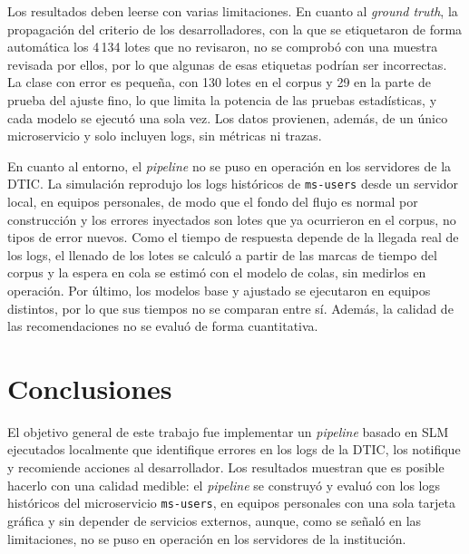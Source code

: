 Los resultados deben leerse con varias limitaciones. En cuanto al \textit{ground truth}, la propagación del criterio de los desarrolladores, con la que se etiquetaron de forma automática los 4\,134 lotes que no revisaron, no se comprobó con una muestra revisada por ellos, por lo que algunas de esas etiquetas podrían ser incorrectas. La clase con error es pequeña, con 130 lotes en el corpus y 29 en la parte de prueba del ajuste fino, lo que limita la potencia de las pruebas estadísticas, y cada modelo se ejecutó una sola vez. Los datos provienen, además, de un único microservicio y solo incluyen logs, sin métricas ni trazas.

En cuanto al entorno, el \textit{pipeline} no se puso en operación en los servidores de la DTIC. La simulación reprodujo los logs históricos de \texttt{ms-users} desde un servidor local, en equipos personales, de modo que el fondo del flujo es normal por construcción y los errores inyectados son lotes que ya ocurrieron en el corpus, no tipos de error nuevos. Como el tiempo de respuesta depende de la llegada real de los logs, el llenado de los lotes se calculó a partir de las marcas de tiempo del corpus y la espera en cola se estimó con el modelo de colas, sin medirlos en operación. Por último, los modelos base y ajustado se ejecutaron en equipos distintos, por lo que sus tiempos no se comparan entre sí. Además, la calidad de las recomendaciones no se evaluó de forma cuantitativa.

\section{Conclusiones}\label{sec:conclusiones}

El objetivo general de este trabajo fue implementar un \textit{pipeline} basado en SLM ejecutados localmente que identifique errores en los logs de la DTIC, los notifique y recomiende acciones al desarrollador. Los resultados muestran que es posible hacerlo con una calidad medible: el \textit{pipeline} se construyó y evaluó con los logs históricos del microservicio \texttt{ms-users}, en equipos personales con una sola tarjeta gráfica y sin depender de servicios externos, aunque, como se señaló en las limitaciones, no se puso en operación en los servidores de la institución.

